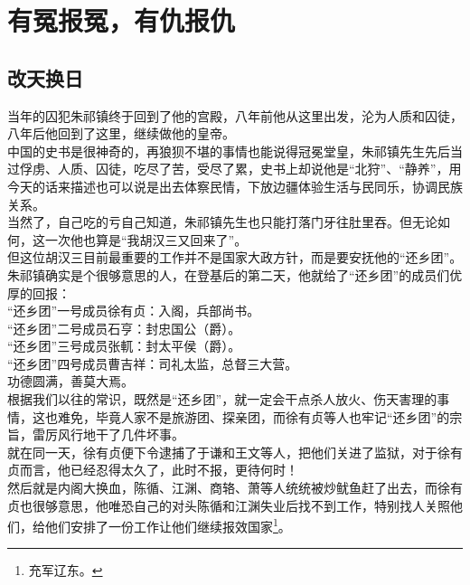 \section{有冤报冤，有仇报仇}
\ifnum{}
	\begin{multicols}{\theparacolNo}
\fi
\subsection{改天换日}
当年的囚犯朱祁镇终于回到了他的宫殿，八年前他从这里出发，沦为人质和囚徒，八年后他回到了这里，继续做他的皇帝。\\

中国的史书是很神奇的，再狼狈不堪的事情也能说得冠冕堂皇，朱祁镇先生先后当过俘虏、人质、囚徒，吃尽了苦，受尽了累，史书上却说他是“北狩”、“静养”，用今天的话来描述也可以说是出去体察民情，下放边疆体验生活与民同乐，协调民族关系。\\

当然了，自己吃的亏自己知道，朱祁镇先生也只能打落门牙往肚里吞。但无论如何，这一次他也算是“我胡汉三又回来了”。\\

但这位胡汉三目前最重要的工作并不是国家大政方针，而是要安抚他的“还乡团”。\\

朱祁镇确实是个很够意思的人，在登基后的第二天，他就给了“还乡团”的成员们优厚的回报：\\

“还乡团”一号成员徐有贞：入阁，兵部尚书。\\

“还乡团”二号成员石亨：封忠国公（爵）。\\

“还乡团”三号成员张軏：封太平侯（爵）。\\

“还乡团”四号成员曹吉祥：司礼太监，总督三大营。\\

功德圆满，善莫大焉。\\

根据我们以往的常识，既然是“还乡团”，就一定会干点杀人放火、伤天害理的事情，这也难免，毕竟人家不是旅游团、探亲团，而徐有贞等人也牢记“还乡团”的宗旨，雷厉风行地干了几件坏事。\\

就在同一天，徐有贞便下令逮捕了于谦和王文等人，把他们关进了监狱，对于徐有贞而言，他已经忍得太久了，此时不报，更待何时！\\

然后就是内阁大换血，陈循、江渊、商辂、萧等人统统被炒鱿鱼赶了出去，而徐有贞也很够意思，他唯恐自己的对头陈循和江渊失业后找不到工作，特别找人关照他们，给他们安排了一份工作让他们继续报效国家\footnote{充军辽东。}。\\


\end{multicols}
